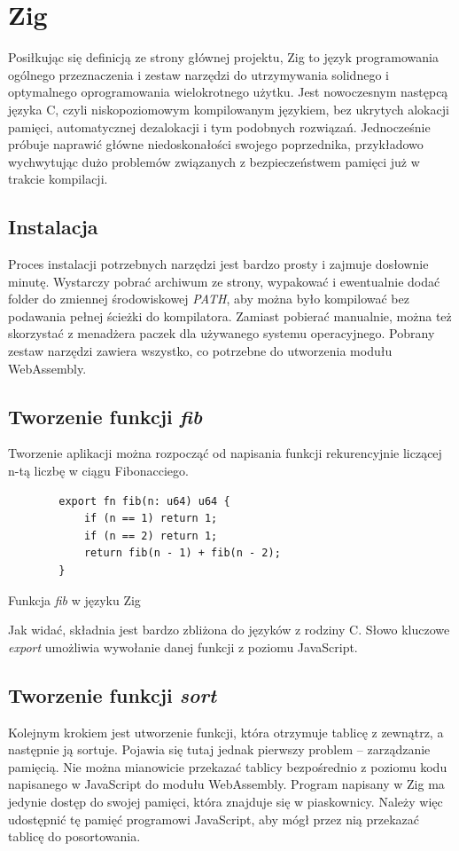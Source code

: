 \documentclass[language=polish,type=master]{aghmodern}
\begin{document}
\section{Zig}
Posiłkując się definicją ze strony głównej projektu\footnotemark{}, Zig to język programowania ogólnego przeznaczenia i zestaw narzędzi do utrzymywania solidnego i optymalnego oprogramowania wielokrotnego użytku.
Jest nowoczesnym następcą języka C, czyli niskopoziomowym kompilowanym językiem, bez ukrytych alokacji pamięci, automatycznej dezalokacji i tym podobnych rozwiązań.
Jednocześnie próbuje naprawić główne niedoskonałości swojego poprzednika, przykładowo wychwytując dużo problemów związanych z bezpieczeństwem pamięci już w trakcie kompilacji.

\subsection{Instalacja}
Proces instalacji potrzebnych narzędzi jest bardzo prosty i zajmuje dosłownie minutę.
Wystarczy pobrać archiwum ze strony, wypakować i ewentualnie dodać folder do zmiennej środowiskowej \emph{PATH}, aby można było kompilować bez podawania pełnej ścieżki do kompilatora.
Zamiast pobierać manualnie, można też skorzystać z menadżera paczek dla używanego systemu operacyjnego.
Pobrany zestaw narzędzi zawiera wszystko, co potrzebne do utworzenia modułu WebAssembly.

\subsection{Tworzenie funkcji \emph{fib}}
Tworzenie aplikacji można rozpocząć od napisania funkcji rekurencyjnie liczącej n-tą liczbę w ciągu Fibonacciego.

\begin{listing}[H]
    \begin{verbatim}
        export fn fib(n: u64) u64 {
            if (n == 1) return 1;
            if (n == 2) return 1;
            return fib(n - 1) + fib(n - 2);
        }
    \end{verbatim}
    \caption{Funkcja \emph{fib} w języku Zig}
\end{listing}

Jak widać, składnia jest bardzo zbliżona do języków z rodziny C.
Słowo kluczowe \emph{export} umożliwia wywołanie danej funkcji z poziomu JavaScript.

\subsection{Tworzenie funkcji \emph{sort}}
Kolejnym krokiem jest utworzenie funkcji, która otrzymuje tablicę z zewnątrz, a następnie ją sortuje.
Pojawia się tutaj jednak pierwszy problem -- zarządzanie pamięcią.
Nie można mianowicie przekazać tablicy bezpośrednio z poziomu kodu napisanego w JavaScript do modułu WebAssembly.
Program napisany w Zig ma jedynie dostęp do swojej pamięci, która znajduje się w piaskownicy.
Należy więc udostępnić tę pamięć programowi JavaScript, aby mógł przez nią przekazać tablicę do posortowania.
\end{document}
